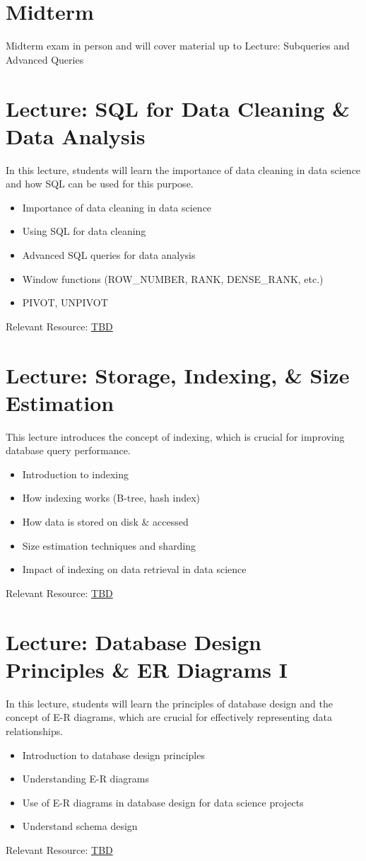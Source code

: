 \documentclass[11pt, letterpaper]{article}
\let\oldsection\section
\renewcommand\section{\clearpage\oldsection}
\begin{document}
	\section*{Midterm}
	Midterm exam in person and will cover material up to Lecture: Subqueries and Advanced Queries
	
	\section*{Lecture: SQL for Data Cleaning \& Data Analysis}
	In this lecture, students will learn the importance of data cleaning in data science and how SQL can be used for this purpose.
	\begin{itemize}
		\item Importance of data cleaning in data science
		\item Using SQL for data cleaning
		\item Advanced SQL queries for data analysis
		\item Window functions (ROW\_NUMBER, RANK, DENSE\_RANK, etc.)
		\item PIVOT, UNPIVOT
	\end{itemize}
	Relevant Resource: \href{https://example.com}{TBD}
	
	\section*{Lecture: Storage, Indexing, \& Size Estimation}
	This lecture introduces the concept of indexing, which is crucial for improving database query performance.
	\begin{itemize}
		\item Introduction to indexing
		\item How indexing works (B-tree, hash index)
		\item How data is stored on disk \& accessed
		\item Size estimation techniques and sharding
		\item Impact of indexing on data retrieval in data science
	\end{itemize}
	Relevant Resource: \href{https://example.com}{TBD}
	
	\section*{Lecture: Database Design Principles \& ER Diagrams I}
	In this lecture, students will learn the principles of database design and the concept of E-R diagrams, which are crucial for effectively representing data relationships.
	\begin{itemize}
		\item Introduction to database design principles
		\item Understanding E-R diagrams
		\item Use of E-R diagrams in database design for data science projects
		\item Understand schema design
	\end{itemize}
	Relevant Resource: \href{https://example.com}{TBD}
	
\end{document}
